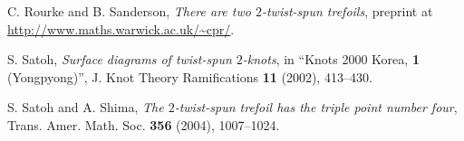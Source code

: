 \documentclass[12pt]{amsart}
\theoremstyle{definition}
\begin{document}
\begin{thebibliography}{99}
C. Rourke and B. Sanderson, {\it There are two $2$-twist-spun trefoils}, preprint at \url{http://www.maths.warwick.ac.uk/~cpr/}.

S. Satoh, {\it Surface diagrams of twist-spun $2$-knots}, in ``Knots 2000 Korea, {\bf 1} (Yongpyong)'', J. Knot Theory Ramifications {\bf 11} (2002), 413--430.

S. Satoh and A. Shima, {\it The $2$-twist-spun trefoil has the triple point number four}, Trans. Amer. Math. Soc. {\bf 356} (2004), 1007--1024.

\end{thebibliography}
\end{document}
